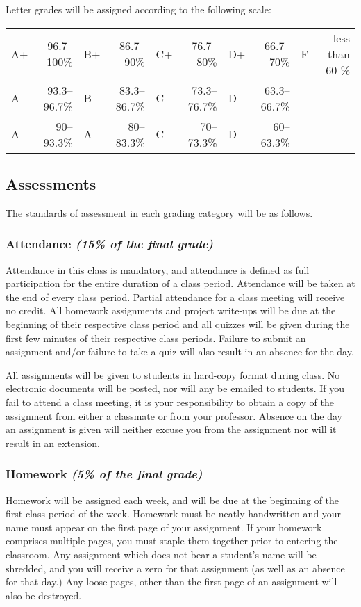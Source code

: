 \documentclass[11pt]{article}
\begin{document}
Letter grades will be assigned according to the following scale:

\begin{tabular}{|lr|lr|lr|lr|lr|}
    \hline
    A+ & 96.7--100\% & B+ & 86.7--90\% & C+ & 76.7--80\% & D+ & 66.7--70\% & F & less than 60 \% \\
    A  & 93.3--96.7\% & B & 83.3--86.7\% & C & 73.3--76.7\% & D & 63.3--66.7\% & & \\
    A- & 90--93.3\% & A- & 80--83.3\% & C- & 70--73.3\% & D- & 60--63.3\% & & \\
    \hline
\end{tabular}


\subsection*{Assessments}
The standards of assessment in each grading category will be as follows. 

\subsubsection*{Attendance {\em (15\% of the final grade)}}
Attendance in this class is
mandatory, and attendance is defined as full participation for the
entire duration of a class period. Attendance will be taken at the
end of every class period. Partial attendance for a class meeting
will receive no credit. All homework assignments and project write-ups
will be due at the beginning of their respective class period and all
quizzes will be given during the first few minutes of their respective
class periods. Failure to submit an assignment and/or failure to take
a quiz will also result in an absence for the day.

All assignments will be given to students in hard-copy format during
class. No electronic documents will be posted, nor will any be
emailed to students. If you fail to attend a class meeting, it is
your responsibility to obtain a copy of the assignment from either
a classmate or from your professor. Absence on the day an assignment
is given will neither excuse you from the assignment nor will it
result in an extension.

\subsubsection*{Homework {\em(5\% of the final grade)}}
Homework will be assigned each
week, and will be due at the beginning of the first class period of
the week. Homework must be neatly handwritten and your name must
appear on the first page of your assignment. If your homework
comprises multiple pages, you must staple them together prior to
entering the classroom. Any assignment which does not bear
a student's name will be shredded, and you will receive a zero for
that assignment (as well as an absence for that day.) Any loose pages,
other than the first page of an assignment will also be destroyed.
\end{document}
